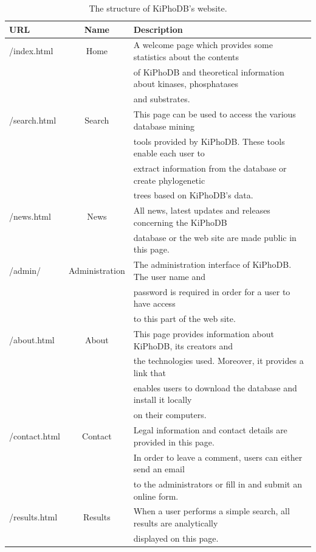 \begin{table}[h]
\vspace{1cm}
\footnotesize
\begin{center}
\begin{tabular}{ | l | c | l | }
\hline
\textbf{URL} & \textbf{Name} & \textbf{Description} \\
\hline
\hline
/index.html & Home & A welcome page which provides some statistics about the contents \\
& & of KiPhoDB and theoretical information about kinases, phosphatases \\
& & and substrates. \\
\hline
/search.html & Search & This page can be used to access the various database mining \\
& & tools provided by KiPhoDB. These tools enable each user to \\
& & extract information from the database or create phylogenetic \\
& & trees based on KiPhoDB's data. \\
\hline
/news.html & News & All news, latest updates and releases concerning the KiPhoDB \\
& & database or the web site are made public in this page. \\
\hline
/admin/ & Administration & The administration interface of KiPhoDB. The user name and \\
& & password is required in order for a user to have access \\
& & to this part of the web site. \\
\hline
/about.html & About & This page provides information about KiPhoDB, its creators and \\
& & the technologies used. Moreover, it provides a link that \\
& & enables users to download the database and install it locally \\
& & on their computers. \\
\hline
/contact.html & Contact & Legal information and contact details are provided in this page.\\
& & In order to leave a comment, users can either send an email \\
& & to the administrators or fill in and submit an online form. \\
\hline
/results.html & Results & When a user performs a simple search, all results are analytically \\
& & displayed on this page. \\
\hline
\end{tabular}
\end{center}
\normalsize
\caption{The structure of KiPhoDB's website.}
\label{table:WebSiteStructure}
\vspace{1cm}
\end{table}

